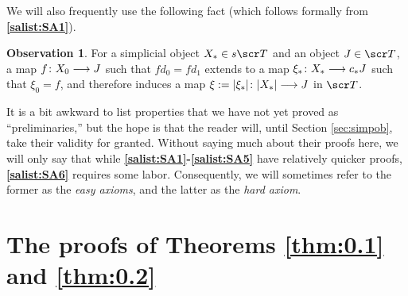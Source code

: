 \documentclass{amsart}
\theoremstyle{definition}
\newtheorem{obs}[thm]{Observation}
\begin{document}
\noindent We will also frequently use the following fact (which follows formally from \textbf{\ref{salist:SA1}}). 
\begin{obs}\label{obs:4.1}
For a simplicial object $X_* \in s\sT$ and an object $J \in \sT$, a map $f \colon X_0 \longrightarrow J$ such that $fd_0 = fd_1$
extends to a map $\xi_* \colon X_* \longrightarrow c_* J$ such that $\xi_0 = f$, and therefore induces a map $\xi:=|\xi_*| \colon |X_*| \longrightarrow J$ in $\sT$.
\end{obs}
It is a bit awkward to list properties that we have not yet proved as ``preliminaries,'' but the hope is that the reader will, until Section \ref{sec:simpob}, take their validity for granted. Without saying much about their proofs here, we will only say that while \textbf{\ref{salist:SA1}-\ref{salist:SA5}}
have relatively quicker proofs, \textbf{\ref{salist:SA6}} requires some labor. Consequently, we will sometimes refer to the former as the \emph{easy axioms}, and the latter as the \emph{hard axiom}.

\section{The proofs of Theorems \ref{thm:0.1} and \ref{thm:0.2}}\label{sec:thm}
\end{document}
